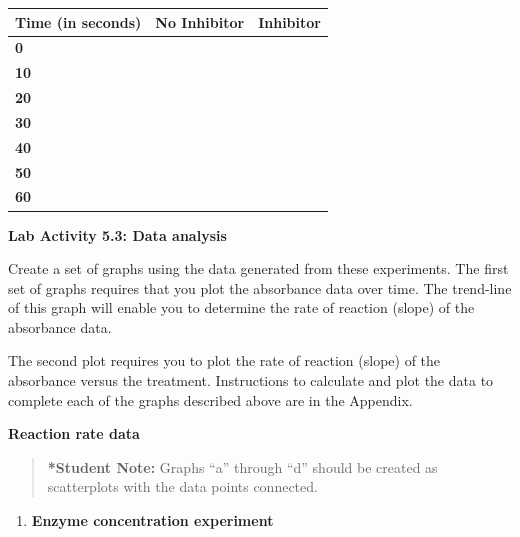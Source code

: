 \documentclass[
  letterpaper,
  DIV=11,
  numbers=noendperiod]{scrreprt}
\newcounter{none} %
\providecommand{\tightlist}{%
  \setlength{\itemsep}{0pt}\setlength{\parskip}{0pt}}
\begin{document}
{\def\LTcaptype{none} %
\begin{longtable}[]{@{}
  >{\centering\arraybackslash}p{}
  >{\centering\arraybackslash}p{}
  >{\centering\arraybackslash}p{}@{}}
\toprule\noalign{}
\begin{minipage}[b]{\linewidth}\centering
\textbf{Time (in seconds)}
\end{minipage} & \begin{minipage}[b]{\linewidth}\centering
\textbf{No Inhibitor}
\end{minipage} & \begin{minipage}[b]{\linewidth}\centering
\textbf{Inhibitor}
\end{minipage} \\
\midrule\noalign{}
\endhead
\bottomrule\noalign{}
\endlastfoot
\textbf{0} & & \\
\textbf{10} & & \\
\textbf{20} & & \\
\textbf{30} & & \\
\textbf{40} & & \\
\textbf{50} & & \\
\textbf{60} & & \\
\end{longtable}
}

\textbf{Lab Activity 5.3: Data analysis}

Create a set of graphs using the data generated from these experiments.
The first set of graphs requires that you plot the absorbance data over
time. The trend-line of this graph will enable you to determine the rate
of reaction (slope) of the absorbance data.

The second plot requires you to plot the rate of reaction (slope) of the
absorbance versus the treatment. Instructions to calculate and plot the
data to complete each of the graphs described above are in the Appendix.

\textbf{Reaction rate data}

\begin{quote}
\textbf{*Student Note:} Graphs ``a'' through ``d'' should be created as
scatterplots with the data points connected.
\end{quote}

\begin{enumerate}
\def\labelenumi{\alph{enumi})}
\tightlist
\item
  \textbf{Enzyme concentration experiment}
\end{enumerate}
\end{document}
